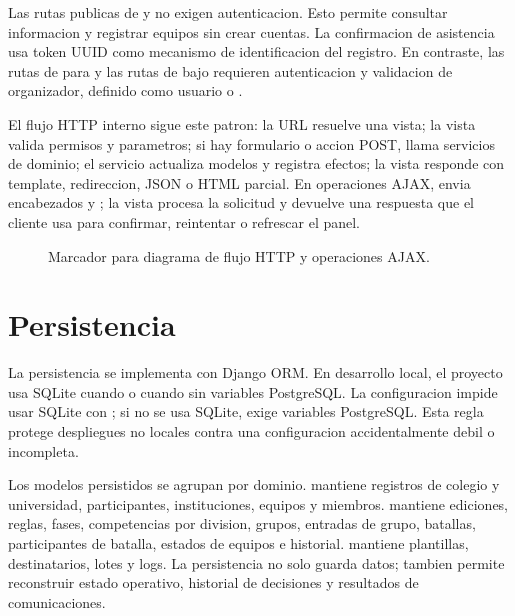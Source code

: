 Las rutas publicas de  y  no exigen autenticacion. Esto permite consultar informacion y registrar equipos sin crear cuentas. La confirmacion de asistencia usa token UUID como mecanismo de identificacion del registro. En contraste, las rutas de  para  y las rutas de  bajo  requieren autenticacion y validacion de organizador, definido como usuario  o .

El flujo HTTP interno sigue este patron: la URL resuelve una vista; la vista valida permisos y parametros; si hay formulario o accion POST, llama servicios de dominio; el servicio actualiza modelos y registra efectos; la vista responde con template, redireccion, JSON o HTML parcial. En operaciones AJAX,  envia encabezados  y ; la vista procesa la solicitud y devuelve una respuesta que el cliente usa para confirmar, reintentar o refrescar el panel.

\begin{figure}[H]
  \centering
  \caption{Marcador para diagrama de flujo HTTP y operaciones AJAX.}
  \label{fig:arquitectura-flujo-http}
\end{figure}

\section{Persistencia}
\label{sec:arquitectura-persistencia}

La persistencia se implementa con Django ORM. En desarrollo local, el proyecto usa SQLite cuando  o cuando  sin variables PostgreSQL. La configuracion impide usar SQLite con ; si no se usa SQLite, exige variables PostgreSQL. Esta regla protege despliegues no locales contra una configuracion accidentalmente debil o incompleta.

Los modelos persistidos se agrupan por dominio.  mantiene registros de colegio y universidad, participantes, instituciones, equipos y miembros.  mantiene ediciones, reglas, fases, competencias por division, grupos, entradas de grupo, batallas, participantes de batalla, estados de equipos e historial.  mantiene plantillas, destinatarios, lotes y logs. La persistencia no solo guarda datos; tambien permite reconstruir estado operativo, historial de decisiones y resultados de comunicaciones.

